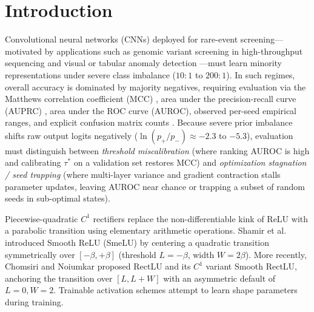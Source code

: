 \documentclass[11pt, a4paper]{article}
\begin{document}
\begin{abstract}
\vspace{0.3em}
\noindent \textbf{Keywords:} Activation function; Piecewise-quadratic rectifier; SmeLU; Smooth RectLU; Gradient propagation; Class imbalance; Matthews correlation coefficient
\end{abstract}

\section{Introduction}
Convolutional neural networks (CNNs) deployed for rare-event screening---motivated by applications such as genomic variant screening in high-throughput sequencing \cite{ref1, ref2, ref3, ref6, ref35} and visual or tabular anomaly detection \cite{ref13, ref14}---must learn minority representations under severe class imbalance ($10:1$ to $200:1$). In such regimes, overall accuracy is dominated by majority negatives, requiring evaluation via the Matthews correlation coefficient (MCC) \cite{ref8, ref9}, area under the precision-recall curve (AUPRC) \cite{ref10, ref11}, area under the ROC curve (AUROC), observed per-seed empirical ranges, and explicit confusion matrix counts \cite{ref12, ref14}. Because severe prior imbalance shifts raw output logits negatively ($\ln(p_{+}/p_{-}) \approx -2.3$ to $-5.3$), evaluation must distinguish between \textit{threshold miscalibration} (where ranking AUROC is high and calibrating $\tau^{*}$ on a validation set restores MCC) and \textit{optimization stagnation / seed trapping} (where multi-layer variance and gradient contraction stalls parameter updates, leaving AUROC near chance or trapping a subset of random seeds in sub-optimal states).

Piecewise-quadratic $C^{1}$ rectifiers replace the non-differentiable kink of ReLU \cite{ref22, ref23} with a parabolic transition using elementary arithmetic operations. Shamir et al.\ \cite{ref41} introduced Smooth ReLU (SmeLU) by centering a quadratic transition symmetrically over $[-\beta, +\beta]$ (threshold $L = -\beta$, width $W = 2\beta$). More recently, Chomsiri and Noiumkar \cite{ref15} proposed RectLU and its $C^{1}$ variant Smooth RectLU, anchoring the transition over $[L, L+W]$ with an asymmetric default of $L = 0, W = 2$. Trainable activation schemes \cite{ref26, ref30, ref39} attempt to learn shape parameters during training.
\end{document}
